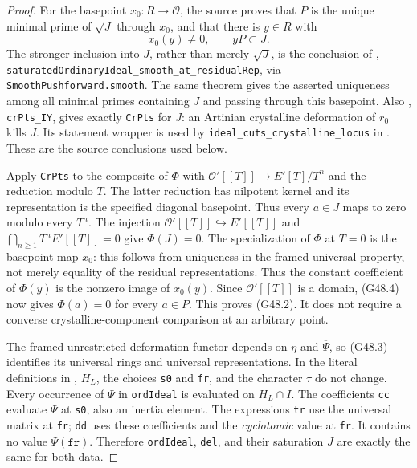 \begin{proof}
For the basepoint $x_0:R\to\mathcal O$, the source proves
that $P$ is the unique minimal prime of $\sqrt J$ through
$x_0$, and that there is $y\in R$ with
\[
       x_0(y)\ne0,\qquad yP\subset J.                \tag{G48.4}
\]
The stronger inclusion into $J$, rather than merely
$\sqrt J$, is the conclusion of
,
\texttt{saturatedOrdinaryIdeal\_smooth\_at\_residualRep},
via \texttt{SmoothPushforward.smooth}.
The same theorem gives the asserted uniqueness among all
minimal primes containing $J$ and passing through this
basepoint.  Also
,
\texttt{crPts\_IY}, gives exactly \texttt{CrPts} for $J$:
an Artinian crystalline deformation of $r_0$ kills $J$.
Its statement wrapper is used by
\texttt{ideal\_cuts\_crystalline\_locus} in
.
These are the source conclusions used below.

Apply \texttt{CrPts} to the composite of $\Phi$ with
$\mathcal O'[[T]]\to E'[T]/T^n$ and the reduction modulo
$T$.  The latter reduction has nilpotent kernel and its
representation is the specified diagonal basepoint.  Thus
every $a\in J$ maps to zero modulo every $T^n$.
The injection $\mathcal O'[[T]]\hookrightarrow E'[[T]]$
and $\bigcap_{n\ge1}T^nE'[[T]]=0$ give $\Phi(J)=0$.
The specialization of $\Phi$ at $T=0$ is the basepoint map
$x_0$: this follows from uniqueness in the framed universal
property, not merely equality of the residual representations.
Thus the constant coefficient of $\Phi(y)$ is the nonzero image
of $x_0(y)$.  Since $\mathcal O'[[T]]$ is a domain,
(G48.4) now gives $\Phi(a)=0$ for every $a\in P$.
This proves (G48.2).  It does not require a converse
crystalline-component comparison at an arbitrary point.

The framed unrestricted deformation functor depends on
$\eta$ and $\overline\Psi$, so (G48.3) identifies its
universal rings and universal representations.
In the literal definitions in
,
$H_L$, the choices \texttt{s0} and \texttt{fr}, and
the character $\tau$ do not change.  Every occurrence of
$\Psi$ in \texttt{ordIdeal} is evaluated on
$H_L\cap I$.  The coefficients \texttt{cc} evaluate
$\Psi$ at \texttt{s0}, also an inertia element.
The expressions \texttt{tr} use the universal matrix at
\texttt{fr}; \texttt{dd} uses these coefficients and
the \emph{cyclotomic} value at \texttt{fr}.
It contains no value $\Psi(\texttt{fr})$.
Therefore \texttt{ordIdeal}, \texttt{del}, and their
saturation $J$ are exactly the same for both data.


\end{proof}
